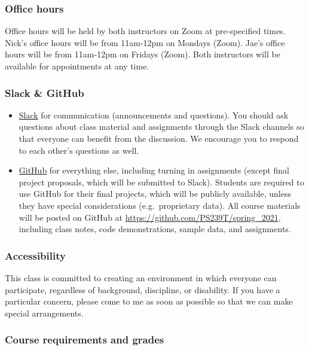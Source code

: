 \documentclass[
]{article}
\begin{document}
\hypertarget{office-hours}{%
\subsubsection{Office hours}\label{office-hours}}

Office hours will be held by both instructors on Zoom at pre-specified
times. Nick's office hours will be from 11am-12pm on Mondays (Zoom).
Jae's office hours will be from 11am-12pm on Fridays (Zoom). Both
instructors will be available for appointments at any time.

\hypertarget{slack-github}{%
\subsubsection{Slack \& GitHub}\label{slack-github}}

\begin{itemize}
\item
  \href{https://slack.com/}{Slack} for communication (announcements and
  questions). You should ask questions about class material and
  assignments through the Slack channels so that everyone can benefit
  from the discussion. We encourage you to respond to each other's
  questions as well.
\item
  \href{https://github.com/}{GitHub} for everything else, including
  turning in assignments (except final project proposals, which will be
  submitted to Slack). Students are required to use GitHub for their
  final projects, which will be publicly available, unless they have
  special considerations (e.g.~proprietary data). All course materials
  will be posted on GitHub at
  \url{https://github.com/PS239T/spring_2021}, including class notes,
  code demonstrations, sample data, and assignments.
\end{itemize}

\hypertarget{accessibility}{%
\subsubsection{Accessibility}\label{accessibility}}

This class is committed to creating an environment in which everyone can
participate, regardless of background, discipline, or disability. If you
have a particular concern, please come to me as soon as possible so that
we can make special arrangements.

\hypertarget{course-requirements-and-grades}{%
\subsubsection{Course requirements and
grades}\label{course-requirements-and-grades}}
\end{document}
